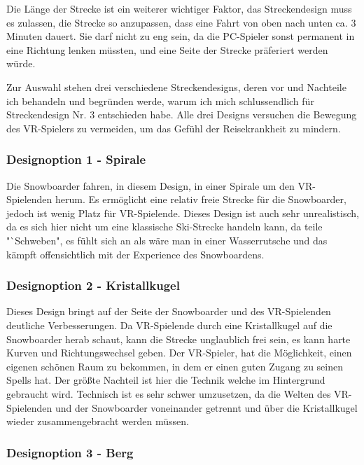 Die Länge der Strecke ist ein weiterer wichtiger Faktor, das Streckendesign muss es zulassen, die Strecke so anzupassen, dass eine Fahrt von oben nach unten ca. 3 Minuten dauert. Sie darf nicht zu eng sein, da die PC-Spieler sonst permanent in eine Richtung lenken müssten, und eine Seite der Strecke präferiert werden würde.

Zur Auswahl stehen drei verschiedene Streckendesigns, deren vor und Nachteile ich behandeln und begründen werde, warum ich mich schlussendlich für Streckendesign Nr. 3 entschieden habe. Alle drei Designs versuchen die Bewegung des VR-Spielers zu vermeiden, um das Gefühl der Reisekrankheit zu mindern.

\subsubsection{Designoption 1 - Spirale}

Die Snowboarder fahren, in diesem Design, in einer Spirale um den VR-Spielenden herum. Es ermöglicht eine relativ freie Strecke für die Snowboarder, jedoch ist wenig Platz für VR-Spielende. Dieses Design ist auch sehr unrealistisch, da es sich hier nicht um eine klassische Ski-Strecke handeln kann, da teile "`Schweben", es fühlt sich an als wäre man in einer Wasserrutsche und das kämpft offensichtlich mit der Experience des Snowboardens.

\subsubsection{Designoption 2 - Kristallkugel}

Dieses Design bringt auf der Seite der Snowboarder und des VR-Spielenden deutliche Verbesserungen. Da VR-Spielende durch eine Kristallkugel auf die Snowboarder herab schaut, kann die Strecke unglaublich frei sein, es kann harte Kurven und Richtungswechsel geben. Der VR-Spieler, hat die Möglichkeit, einen eigenen schönen Raum zu bekommen, in dem er einen guten Zugang zu seinen Spells hat. Der größte Nachteil ist hier die Technik welche im Hintergrund gebraucht wird. Technisch ist es sehr schwer umzusetzen, da die Welten des VR-Spielenden und der Snowboarder voneinander getrennt und über die Kristallkugel wieder zusammengebracht werden müssen.

\subsubsection{Designoption 3 - Berg}


